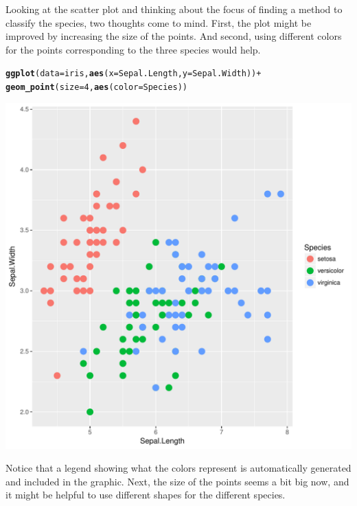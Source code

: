 \documentclass[12pt,oneside]{book}\usepackage[]{graphicx}\usepackage[]{color}
\makeatletter
\def\maxwidth{ %
  \ifdim\Gin@nat@width>\linewidth
    \linewidth
  \else
    \Gin@nat@width
  \fi
}
\newcommand{\hlnum}[1]{\textcolor[rgb]{0.686,0.059,0.569}{#1}}%
\newcommand{\hlopt}[1]{\textcolor[rgb]{0,0,0}{#1}}%
\newcommand{\hlstd}[1]{\textcolor[rgb]{0.345,0.345,0.345}{#1}}%
\newcommand{\hlkwc}[1]{\textcolor[rgb]{0.333,0.667,0.333}{#1}}%
\newcommand{\hlkwd}[1]{\textcolor[rgb]{0.737,0.353,0.396}{\textbf{#1}}}%
\newenvironment{kframe}{%
 \def\at@end@of@kframe{}%
 \ifinner\ifhmode%
  \def\at@end@of@kframe{\end{minipage}}%
  \begin{minipage}{\columnwidth}%
 \fi\fi%
 \def\FrameCommand##1{\hskip\@totalleftmargin \hskip-\fboxsep
 \colorbox{shadecolor}{##1}\hskip-\fboxsep
     \hskip-\linewidth \hskip-\@totalleftmargin \hskip\columnwidth}%
 \MakeFramed {\advance\hsize-\width
   \@totalleftmargin\z@ \linewidth\hsize
   \@setminipage}}%
 {\par\unskip\endMakeFramed%
 \at@end@of@kframe}
\newenvironment{knitrout}{}{} %
\makeatother
\begin{document}
Looking at the scatter plot and thinking about the focus of finding a method to classify the species, two thoughts come to mind. First, the plot might be improved by increasing the size of the points. And second, using different colors for the points corresponding to the three species would help. 

\begin{knitrout}
\color{fgcolor}\begin{kframe}
\begin{alltt}
\hlkwd{ggplot}\hlstd{(}\hlkwc{data} \hlstd{= iris,} \hlkwd{aes}\hlstd{(}\hlkwc{x} \hlstd{= Sepal.Length,} \hlkwc{y} \hlstd{= Sepal.Width))} \hlopt{+}
    \hlkwd{geom_point}\hlstd{(}\hlkwc{size} \hlstd{=} \hlnum{4}\hlstd{,} \hlkwd{aes}\hlstd{(}\hlkwc{color}\hlstd{=Species))}
\end{alltt}
\end{kframe}
\includegraphics[width=\maxwidth]{figure/unnamed-chunk-62-1} 

\end{knitrout}
Notice that a legend showing what the colors represent is automatically generated and included in the graphic. Next, the size of the points seems a bit big now, and it might be helpful to use different shapes for the different species.
\end{document}
